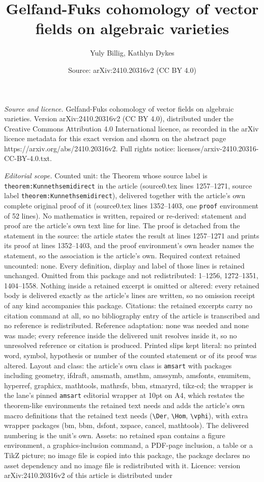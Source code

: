 \documentclass[10pt,a4paper]{amsart}
\title[Gelfand-Fuks cohomology of vector fields on algebraic variet]{Gelfand-Fuks cohomology of vector fields on algebraic varieties}
\author{Yuly Billig, Kathlyn Dykes}
\date{Source: arXiv:2410.20316v2 (CC BY 4.0)}
\begin{document}
\maketitle

\noindent\emph{Source and licence.} Gelfand-Fuks cohomology of vector fields on algebraic varieties. Version arXiv:2410.20316v2 (CC BY 4.0), distributed under the Creative Commons Attribution 4.0 International licence, as recorded in the arXiv licence metadata for this exact version and shown on the abstract page https://arxiv.org/abs/2410.20316v2. Full rights notice: licenses/arxiv-2410.20316-CC-BY-4.0.txt.\par\smallskip

\noindent\textit{Editorial scope.} Counted unit: the Theorem whose source label is \texttt{theorem:Kunnethsemidirect} in the article (source0.tex lines 1257--1271, source label \texttt{theorem:Kunnethsemidirect}), delivered together with the article's own complete original proof of it (source0.tex lines 1352--1403, one \texttt{proof} environment of 52 lines). No mathematics is written, repaired or re-derived: statement and proof are the article's own text line for line. The proof is detached from the statement in the source: the article states the result at lines 1257--1271 and prints its proof at lines 1352--1403, and the proof environment's own header names the statement, so the association is the article's own. Required context retained uncounted: none. Every definition, display and label of those lines is retained unchanged. Omitted from this package and not redistributed: 1--1256, 1272--1351, 1404--1558. Nothing inside a retained excerpt is omitted or altered: every retained body is delivered exactly as the article's lines are written, so no omission receipt of any kind accompanies this package. Citations: the retained excerpts carry no citation command at all, so no bibliography entry of the article is transcribed and no reference is redistributed. Reference adaptation: none was needed and none was made; every reference inside the delivered unit resolves inside it, so no unresolved reference or citation is produced. Printed slips kept literal: no printed word, symbol, hypothesis or number of the counted statement or of its proof was altered. Layout and class: the article's own class is \texttt{amsart} with packages including geometry, ifdraft, amsmath, amsthm, amssymb, amsfonts, enumitem, hyperref, graphicx, mathtools, mathrsfs, bbm, stmaryrd, tikz-cd; the wrapper is the lane's pinned \texttt{amsart} editorial wrapper at 10pt on A4, which restates the theorem-like environments the retained text needs and adds the article's own macro definitions that the retained text needs (\texttt{\textbackslash Der}, \texttt{\textbackslash Hom}, \texttt{\textbackslash vphi}), with extra wrapper packages (bm, bbm, dsfont, xspace, cancel, mathtools). The delivered numbering is the unit's own. Assets: no retained span contains a figure environment, a graphics-inclusion command, a PDF-page inclusion, a table or a TikZ picture; no image file is copied into this package, the package declares no asset dependency and no image file is redistributed with it. Licence: version arXiv:2410.20316v2 of this article is distributed under 
\end{document}
